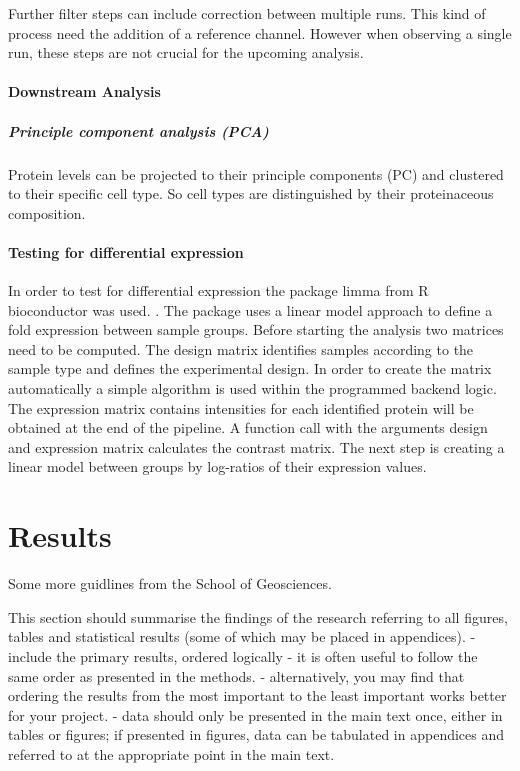 \documentclass[
  11pt,
]{article}
\begin{document}
Further filter steps can include correction between multiple runs. This
kind of process need the addition of a reference channel. However when
observing a single run, these steps are not crucial for the upcoming
analysis.

\hypertarget{downstream-analysis}{%
\paragraph{Downstream Analysis}\label{downstream-analysis}}

\hypertarget{principle-component-analysis-pca}{%
\subparagraph{Principle component analysis
(PCA)}\label{principle-component-analysis-pca}}

Protein levels can be projected to their principle components (PC) and
clustered to their specific cell type. So cell types are distinguished
by their proteinaceous composition.

\hypertarget{testing-for-differential-expression}{%
\paragraph{Testing for differential
expression}\label{testing-for-differential-expression}}

In order to test for differential expression the package limma from R
bioconductor was used. \citep{Phipson2016}. The package uses a linear
model approach to define a fold expression between sample groups. Before
starting the analysis two matrices need to be computed. The design
matrix identifies samples according to the sample type and defines the
experimental design. In order to create the matrix automatically a
simple algorithm is used within the programmed backend logic. The
expression matrix contains intensities for each identified protein will
be obtained at the end of the pipeline. A function call with the
arguments design and expression matrix calculates the contrast matrix.
The next step is creating a linear model between groups by log-ratios of
their expression values.

\newpage

\hypertarget{results}{%
\section{Results}\label{results}}

Some more guidlines from the School of Geosciences.

This section should summarise the findings of the research referring to
all figures, tables and statistical results (some of which may be placed
in appendices). - include the primary results, ordered logically - it is
often useful to follow the same order as presented in the methods. -
alternatively, you may find that ordering the results from the most
important to the least important works better for your project. - data
should only be presented in the main text once, either in tables or
figures; if presented in figures, data can be tabulated in appendices
and referred to at the appropriate point in the main text.
\end{document}
